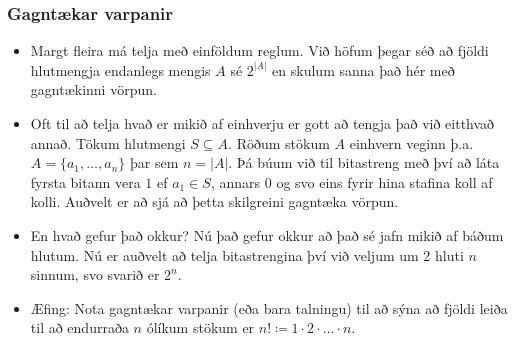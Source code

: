 \documentclass{beamer}
\newcommand\abs[1]{\left|#1\right|}
\begin{document}
\begin{frame}
\frametitle{Gagntækar varpanir}

\begin{itemize}

\item<1-> Margt fleira má telja með einföldum reglum. Við höfum þegar séð að fjöldi hlutmengja endanlegs mengis $A$ sé $2^{\abs{A}}$ en skulum sanna það hér með gagntækinni vörpun.

\item<2-> Oft til að telja hvað er mikið af einhverju er gott að tengja það við eitthvað annað. Tökum hlutmengi $S \subseteq A$. Röðum stökum $A$ einhvern veginn þ.a. $A = \{a_1,\dots,a_n\}$ þar sem $n = \abs{A}$. Þá búum við til bitastreng með því að láta fyrsta bitann vera $1$ ef $a_1 \in S$, annars $0$ og svo eins fyrir hina stafina koll af kolli. Auðvelt er að sjá að þetta skilgreini gagntæka vörpun.

\item<3-> En hvað gefur það okkur? Nú það gefur okkur að það sé jafn mikið af báðum hlutum. Nú er auðvelt að telja bitastrengina því við veljum um 2 hluti $n$ sinnum, svo svarið er $2^n$.

\item<4-> Æfing: Nota gagntækar varpanir (eða bara talningu) til að sýna að fjöldi leiða til að endurraða $n$ ólíkum stökum er $n! \coloneqq 1\cdot 2 \cdot \dots \cdot n$.

\end{itemize}

\end{frame}
\end{document}
